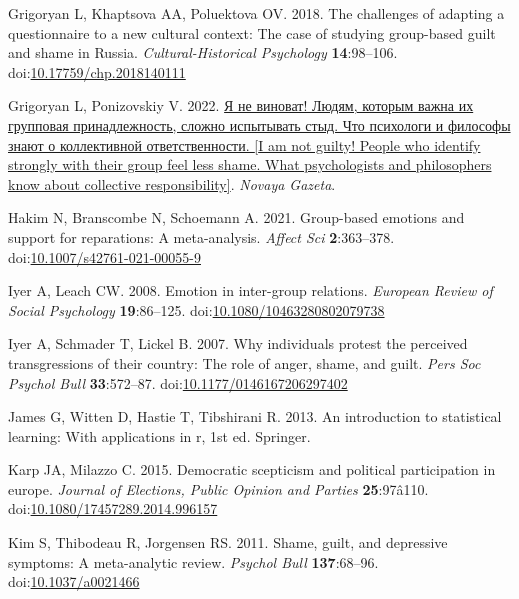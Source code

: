\documentclass[
]{article}
\newlength{\cslhangindent}
\newenvironment{CSLReferences}[2] %
 {\begin{list}{}{%
  \setlength{\itemindent}{0pt}
  \setlength{\leftmargin}{0pt}
  \setlength{\parsep}{0pt}
  \ifodd #1
   \setlength{\leftmargin}{\cslhangindent}
   \setlength{\itemindent}{-1\cslhangindent}
  \fi
  \setlength{\itemsep}{#2\baselineskip}}}
 {\end{list}}
\begin{document}
\begin{CSLReferences}{1}{0}
Grigoryan L, Khaptsova AA, Poluektova OV. 2018. The challenges of adapting a questionnaire to a new cultural context: The case of studying group-based guilt and shame in {Russia}. \emph{Cultural-Historical Psychology} \textbf{14}:98--106. doi:\href{https://doi.org/10.17759/chp.2018140111}{10.17759/chp.2018140111}

Grigoryan L, Ponizovskiy V. 2022. \href{https://novaya.media/articles/2022/08/16/ia-ne-vinovat}{Я не виноват! Людям, которым важна их групповая принадлежность, сложно испытывать стыд. Что психологи и философы знают о коллективной ответственности. {[}I am not guilty! People who identify strongly with their group feel less shame. What psychologists and philosophers know about collective responsibility{]}}. \emph{Novaya Gazeta}.

Hakim N, Branscombe N, Schoemann A. 2021. Group-based emotions and support for reparations: A meta-analysis. \emph{Affect Sci} \textbf{2}:363--378. doi:\href{https://doi.org/10.1007/s42761-021-00055-9}{10.1007/s42761-021-00055-9}

Iyer A, Leach CW. 2008. Emotion in inter-group relations. \emph{European Review of Social Psychology} \textbf{19}:86--125. doi:\href{https://doi.org/10.1080/10463280802079738}{10.1080/10463280802079738}

Iyer A, Schmader T, Lickel B. 2007. Why individuals protest the perceived transgressions of their country: The role of anger, shame, and guilt. \emph{Pers Soc Psychol Bull} \textbf{33}:572--87. doi:\href{https://doi.org/10.1177/0146167206297402}{10.1177/0146167206297402}

James G, Witten D, Hastie T, Tibshirani R. 2013. An introduction to statistical learning: With applications in r, 1st ed. Springer.

Karp JA, Milazzo C. 2015. Democratic scepticism and political participation in europe. \emph{Journal of Elections, Public Opinion and Parties} \textbf{25}:97â110. doi:\href{https://doi.org/10.1080/17457289.2014.996157}{10.1080/17457289.2014.996157}

Kim S, Thibodeau R, Jorgensen RS. 2011. Shame, guilt, and depressive symptoms: A meta-analytic review. \emph{Psychol Bull} \textbf{137}:68--96. doi:\href{https://doi.org/10.1037/a0021466}{10.1037/a0021466}


\end{CSLReferences}
\end{document}

